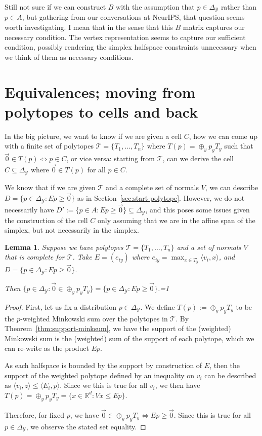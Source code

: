 \documentclass[12pt]{article}
\newcommand{\Comments}{1}
\newcommand{\mytodo}[2]{\ifnum\Comments=1%
  \todo[linecolor=#1!80!black,backgroundcolor=#1,bordercolor=#1!80!black]{#2}\fi}
\newcommand{\btw}[1]{\mytodo{orange!20!white}{BTW: #1}}
\newcommand{\reals}{\mathbb{R}}
\newcommand{\simplex}{\Delta_\Y}
\newcommand{\T}{\mathcal{T}}
\newcommand{\Y}{\mathcal{Y}}
\newcommand{\inprod}[2]{\langle #1, #2 \rangle}%
\newtheorem{lemma}{Lemma}
\begin{document}
  Still not sure if we can construct $B$ with the assumption that $p \in \simplex$ rather than $p \in A$, but gathering from our conversations at NeurIPS, that question seems worth investigating.
  I mean that in the sense that this $B$ matrix captures our necessary condition.
  The vertex representation seems to capture our sufficient condition, possibly rendering the simplex halfspace constraints unnecessary when we think of them as necessary conditions.

  \section{Equivalences; moving from polytopes to cells and back}
  
  In the big picture, we want to know if we are given a cell $C$, how we can come up with a finite set of polytopes $\T = \{T_1, \ldots, T_n\}$ where $T(p) = \oplus_y p_y T_y$ such that $\vec 0 \in T(p) \iff p \in C$, or vice versa: starting from $\T$, can we derive the cell $C \subseteq \simplex$ where $\vec 0 \in T(p)$ for all $p \in C$.
  
  We know that if we are given $\T$ and a complete set of normals $V$, we can describe $D = \{p \in \simplex : Ep \geq \vec 0\}$ as in Section~\ref{sec:start-polytope}.
  However, we do not necessarily have $D' := \{p \in A : Ep \geq \vec 0\} \subseteq \simplex$, and this poses some issues given the construction of the cell $C$ only assuming that we are in the affine span of the simplex, but not necessarily in the simplex.
  
  \begin{lemma}\label{lem:describe-D}
    Suppose we have polytopes $\T = \{T_1, \ldots, T_n\}$ and a set of normals $V$ that is complete for $\T$.
 	Take $E = (e_{iy})$ where $e_{iy} = \max_{x \in T_y} \inprod{v_i}{x}$, and $D = \{p \in \simplex : Ep \geq \vec 0\}$.
 	
 	Then $\{p \in \simplex : \vec 0 \in \oplus_y p_y T_y\} = \{p \in \simplex: Ep \geq \vec 0\}$.\btw{``stuff about $E$ and $D$.''}
  \end{lemma}
  \begin{proof}
    First, let us fix a distribution $p \in \simplex$.
    We define $T(p) := \oplus_y p_y T_y$ to be the $p$-weighted Minkowski sum over the polytopes in $\T$.
    By Theorem~\ref{thm:support-minksum}, we have the support of the (weighted) Minkowski sum is the (weighted) sum of the support of each polytope, which we can re-write as the product $Ep$.
    
    As each halfspace is bounded by the support by construction of $E$, then the support of the weighted polytope defined by an inequality on $v_i$ can be described as $\inprod{v_i}{z} \leq \inprod{E_i}{p}$.
    Since we this is true for all $v_i$, we then have $T(p) = \oplus_y p_y T_y = \{x \in \reals^d : Vx \leq Ep\}$.
    	
    Therefore, for fixed $p$, we have $\vec 0 \in \oplus_y p_y T_y \iff Ep \geq \vec 0$.
    Since this is true for all $p \in \simplex$, we observe the stated set equality.
  \end{proof}
  
\end{document}
